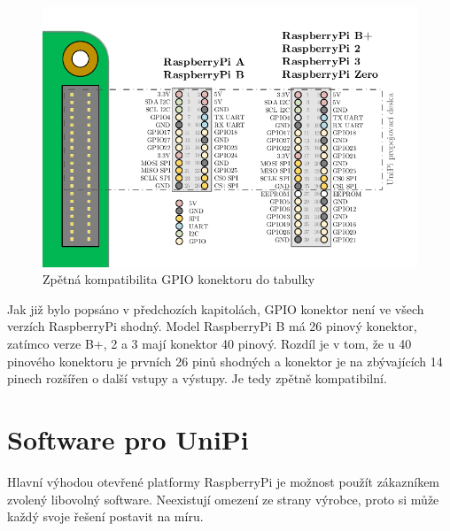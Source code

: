  \begin{figure}[!h]
  \begin{center}
    \includegraphics[scale=0.6]{obrazky/unipi_gpio}
  \end{center}
  \caption{Zpětná kompatibilita GPIO konektoru \cite{raspiGPIOs} \colorbox[rgb]{0,1,0}{do tabulky}}
	\label{ObrazekGPIO}
\end{figure}

\newpage 

Jak již bylo popsáno v předchozích kapitolách, GPIO konektor není ve všech verzích RaspberryPi shodný. Model RaspberryPi B má 26 pinový konektor, zatímco verze B+, 2 a 3 mají konektor 40 pinový. Rozdíl je v tom, že u 40 pinového konektoru je prvních 26 pinů shodných a konektor je na zbývajících 14 pinech rozšířen o další vstupy a výstupy. Je tedy zpětně kompatibilní.




\section{Software pro UniPi}

Hlavní výhodou otevřené platformy RaspberryPi je možnost použít zákazníkem zvolený libovolný software. Neexistují omezení ze strany výrobce, proto si může každý svoje řešení postavit na míru.


